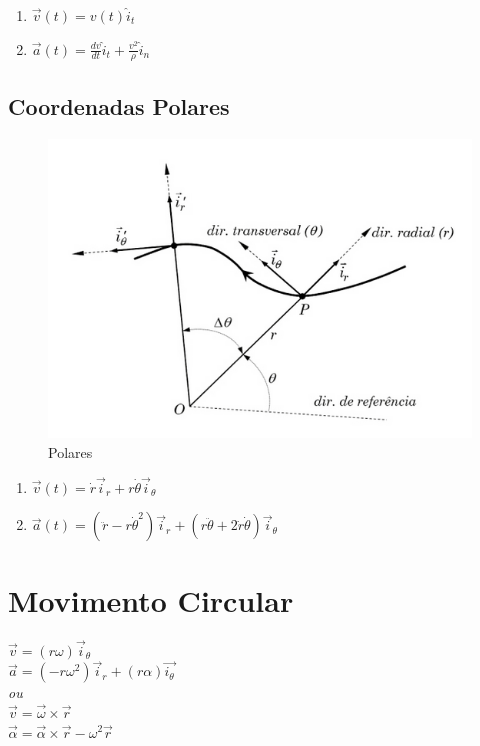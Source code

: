 \documentclass[a4paper, 12pt]{article}
\begin{document}
		\begin{enumerate}
			\item $\vec{v}(t) = v(t) \hat{i}_t$
			\item $\vec{a}(t) = \frac{dv}{dt} \hat{i}_t + \frac{v^2}{\rho} \hat{i}_n$
		\end{enumerate}
	
	\subsection{Coordenadas Polares}
		\begin{figure}[h]
			\center
			\includegraphics[scale=0.5]{imagens/pol.png} 
			\caption{Polares}
		\end{figure}	
		
		\begin{enumerate}
			\item $\vec{v}(t) = \dot{r}\vec{i}_r + r\dot{\theta} \vec{i}_{\theta}$
			\item $\vec{a}(t) = (\ddot{r} - r\dot{\theta}^2)\vec{i}_r + (r\ddot{\theta} + 2 \dot{r}\dot{\theta})\vec{i}_{\theta}$
		\end{enumerate}

\section{Movimento Circular}
	\begin{center}
		\Large
		$
		\vec{v} = (r\omega)\vec{i}_{\theta}		
		$\\
		$
		\vec{a} = (-r\omega^2)\vec{i}_r + (r\alpha)\vec{i_\theta}		
		$\\ \textit{ou}\\
		$
		\vec{v} = \vec{\omega} \times \vec{r}	
		$\\
		$
		\vec{\alpha} = \vec{\alpha} \times \vec{r} - \omega^2\vec{r}	
		$
	\end{center}
\end{document}
